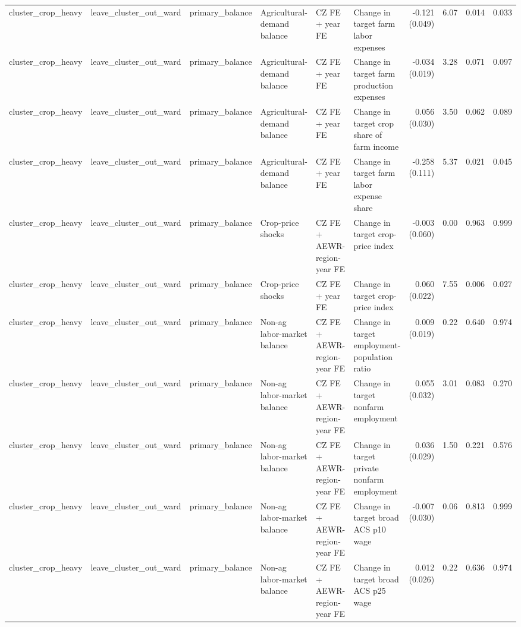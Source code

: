 \begin{tabular}{llllllrrrr}
cluster_crop_heavy & leave_cluster_out_ward & primary_balance & Agricultural-demand balance & CZ FE + year FE & Change in target farm labor expenses & -0.121 (0.049) & 6.07 & 0.014 & 0.033 \\
cluster_crop_heavy & leave_cluster_out_ward & primary_balance & Agricultural-demand balance & CZ FE + year FE & Change in target farm production expenses & -0.034 (0.019) & 3.28 & 0.071 & 0.097 \\
cluster_crop_heavy & leave_cluster_out_ward & primary_balance & Agricultural-demand balance & CZ FE + year FE & Change in target crop share of farm income & 0.056 (0.030) & 3.50 & 0.062 & 0.089 \\
cluster_crop_heavy & leave_cluster_out_ward & primary_balance & Agricultural-demand balance & CZ FE + year FE & Change in target farm labor expense share & -0.258 (0.111) & 5.37 & 0.021 & 0.045 \\
cluster_crop_heavy & leave_cluster_out_ward & primary_balance & Crop-price shocks & CZ FE + AEWR-region-year FE & Change in target crop-price index & -0.003 (0.060) & 0.00 & 0.963 & 0.999 \\
cluster_crop_heavy & leave_cluster_out_ward & primary_balance & Crop-price shocks & CZ FE + year FE & Change in target crop-price index & 0.060 (0.022) & 7.55 & 0.006 & 0.027 \\
cluster_crop_heavy & leave_cluster_out_ward & primary_balance & Non-ag labor-market balance & CZ FE + AEWR-region-year FE & Change in target employment-population ratio & 0.009 (0.019) & 0.22 & 0.640 & 0.974 \\
cluster_crop_heavy & leave_cluster_out_ward & primary_balance & Non-ag labor-market balance & CZ FE + AEWR-region-year FE & Change in target nonfarm employment & 0.055 (0.032) & 3.01 & 0.083 & 0.270 \\
cluster_crop_heavy & leave_cluster_out_ward & primary_balance & Non-ag labor-market balance & CZ FE + AEWR-region-year FE & Change in target private nonfarm employment & 0.036 (0.029) & 1.50 & 0.221 & 0.576 \\
cluster_crop_heavy & leave_cluster_out_ward & primary_balance & Non-ag labor-market balance & CZ FE + AEWR-region-year FE & Change in target broad ACS p10 wage & -0.007 (0.030) & 0.06 & 0.813 & 0.999 \\
cluster_crop_heavy & leave_cluster_out_ward & primary_balance & Non-ag labor-market balance & CZ FE + AEWR-region-year FE & Change in target broad ACS p25 wage & 0.012 (0.026) & 0.22 & 0.636 & 0.974 \\

\end{tabular}
